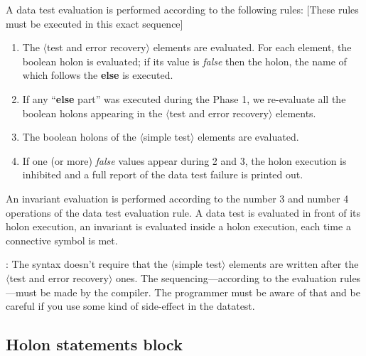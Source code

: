 \documentclass[openany,nobib]{tufte-book}
\newcommand{\kw}[1]{{\bf #1}}
\newcommand{\sym}[1]{$\langle$#1$\rangle$}
\begin{document}
A data test evaluation is performed according to the following rules: [These
rules must be executed in this exact sequence]

\begin{enumerate}
    \item The \sym{test and error recovery} elements are evaluated. For each
element, the boolean holon is evaluated; if its value is {\sl false} then the
holon, the name of which follows the \kw{else} is executed.
    \item If any ``\kw{else} part'' was executed during the Phase 1, we
re-evaluate all the boolean holons appearing in the \sym{test and error
recovery} elements.
    \item The boolean holons of the \sym{simple test} elements are evaluated.
    \item If one (or more) {\it false} values appear during 2 and 3, the holon
execution is inhibited and a full report of the data test failure is printed
out.
\end{enumerate}

An invariant evaluation is performed according to the number 3 and number 4
operations of the data test evaluation rule. A data test is evaluated in front
of its holon execution, an invariant is evaluated inside a holon execution,
each time a connective symbol is met.

\bigskip

: The syntax doesn't require that the \sym{simple test}
elements are written after the \sym{test and error recovery} ones. The
sequencing---according to the evaluation rules---must be made by the compiler.
The programmer must be aware of that and be careful if you use some kind of
side-effect in the datatest.

\subsection{Holon statements block}
\end{document}
